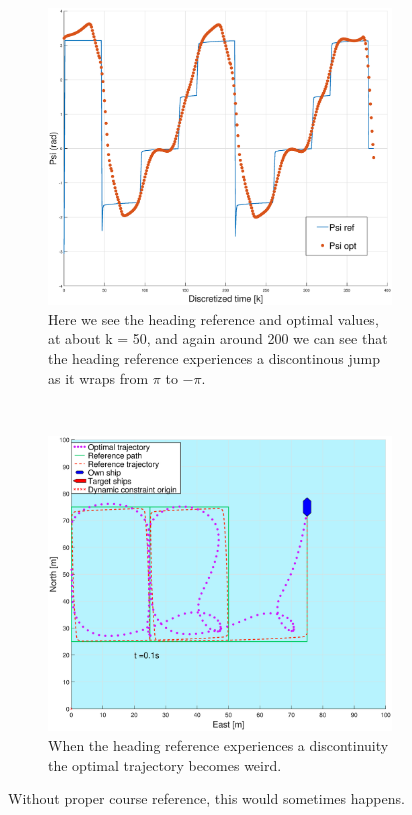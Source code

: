 \clearpage
\begin{figure}[!ht] %
    \centering
    \begin{subfigure}{0.80\textwidth}
        \includegraphics[width=\textwidth]{Images/Figures/Extra_Stuff/WrapTo2Pi_problem_Ref}
        \caption{Here we see the heading reference and optimal values, at about k = 50, and again around 200 we can see that the heading reference experiences a discontinous jump as it wraps
        from $\pi$ to $-\pi$.}
    \end{subfigure}
    \hfill
    \\
    \begin{subfigure}{0.80\textwidth}
        \includegraphics[width=\textwidth]{Images/NewFigures/Extra_Stuff/WrapTo2Pi_problem_Wopt}
        \caption{When the heading reference experiences a discontinuity the optimal trajectory becomes weird.}
    \end{subfigure}
    \caption{Without proper course reference, this would sometimes happens.}
    \label{FIG: WrapTo2Pi misc}
\end{figure}

